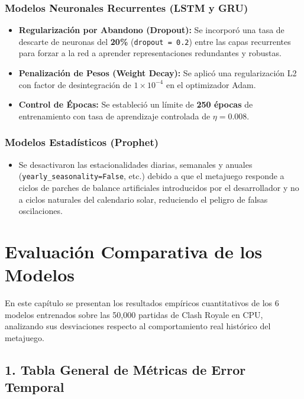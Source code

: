 \documentclass[
  spanish,
  12pt,
]{report}
\providecommand{\tightlist}{%
  \setlength{\itemsep}{0pt}\setlength{\parskip}{0pt}}
\begin{document}
\subsection{Modelos Neuronales Recurrentes (LSTM y
GRU)}\label{modelos-neuronales-recurrentes-lstm-y-gru}

\begin{itemize}
\tightlist
\item
  \textbf{Regularización por Abandono (Dropout):} Se incorporó una tasa
  de descarte de neuronas del \textbf{20\%} (\texttt{dropout\ =\ 0.2})
  entre las capas recurrentes para forzar a la red a aprender
  representaciones redundantes y robustas.
\item
  \textbf{Penalización de Pesos (Weight Decay):} Se aplicó una
  regularización L2 con factor de desintegración de \(1 \times 10^{-4}\)
  en el optimizador Adam.
\item
  \textbf{Control de Épocas:} Se estableció un límite de \textbf{250
  épocas} de entrenamiento con tasa de aprendizaje controlada de
  \(\eta = 0.008\).
\end{itemize}

\subsection{Modelos Estadísticos
(Prophet)}\label{modelos-estaduxedsticos-prophet}

\begin{itemize}
\tightlist
\item
  Se desactivaron las estacionalidades diarias, semanales y anuales
  (\texttt{yearly\_seasonality=False}, etc.) debido a que el metajuego
  responde a ciclos de parches de balance artificiales introducidos por
  el desarrollador y no a ciclos naturales del calendario solar,
  reduciendo el peligro de falsas oscilaciones.
\end{itemize}

\chapter{Evaluación Comparativa de los
Modelos}\label{evaluaciuxf3n-comparativa-de-los-modelos}

En este capítulo se presentan los resultados empíricos cuantitativos de
los 6 modelos entrenados sobre las 50,000 partidas de Clash Royale en
CPU, analizando sus desviaciones respecto al comportamiento real
histórico del metajuego.

\section{1. Tabla General de Métricas de Error
Temporal}\label{tabla-general-de-muxe9tricas-de-error-temporal}
\end{document}
